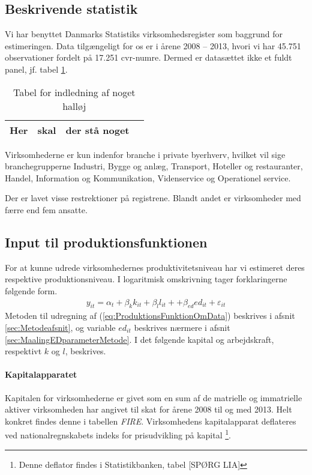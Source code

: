 \subsection{Beskrivende statistik}
Vi har benyttet Danmarks Statistiks virksomhedsregister som baggrund for estimeringen. Data tilgængeligt for os er i årene 2008 -- 2013, hvori vi har 45.751 observationer fordelt på 17.251 cvr-numre. Dermed er datasættet ikke et fuldt panel, jf. tabel \ref{tab:SummaryStatistics}.

\begin{table}
	\caption{Tabel for indledning af noget halløj}
	\label{tab:SummaryStatistics}
	\centering
\begin{tabular}{lrrr}
	\toprule
Her & skal & der stå noget \\
	\bottomrule
\end{tabular}
\end{table}

Virksomhederne er kun indenfor branche i private byerhverv, hvilket vil sige branchegrupperne Industri, Bygge og anlæg, Transport, Hoteller og restauranter, Handel, Information og Kommunikation, Videnservice og Operationel service.

Der er lavet visse restrektioner på registrene. Blandt andet er virksomheder med færre end fem ansatte. 

\subsection{Input til produktionsfunktionen}
For at kunne udrede virksomhedernes produktivitetsniveau har vi estimeret deres respektive produktionsniveau. I logaritmisk omskrivning tager forklaringerne følgende form.
\begin{gather}
	y_{it} = \alpha_t + \beta_k k_{it} + \beta_l l_{it} + 
	+ \beta_{ed} ed_{it} + \varepsilon_{it}
	\label{eq:ProduktionsFunktionOmData}
\end{gather}
Metoden til udregning af (\ref{eq:ProduktionsFunktionOmData}) beskrives i afsnit \ref{sec:Metodeafsnit}, og variable $ed_{it}$ beskrives nærmere i afsnit \ref{sec:MaalingEDparameterMetode}. I det følgende kapital og arbejdskraft, respektivt $k$ og $l$, beskrives.
\paragraph{Kapitalapparatet}
Kapitalen for virksomhederne er givet som en sum af de matrielle og immatrielle aktiver virksomheden har angivet til skat for årene 2008 til og med 2013. Helt konkret findes denne i tabellen \emph{FIRE}. Virksomhedens kapitalapparat deflateres ved nationalregnskabets indeks for prisudvikling på kapital%
\footnote{Denne deflator findes i Statistikbanken, tabel [SPØRG LIA]}.
